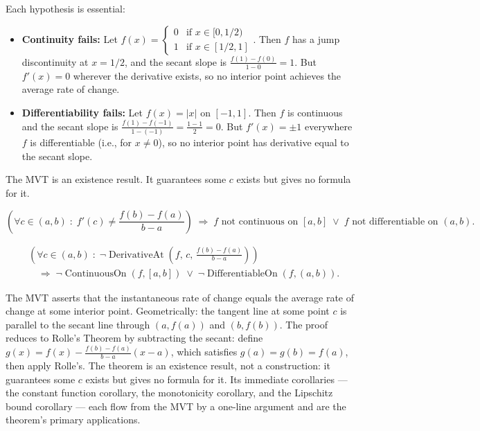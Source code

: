 \begin{remark*}
Each hypothesis is essential:
\begin{itemize}
  \item \textbf{Continuity fails:} Let $f(x) = \begin{cases} 0 & \text{if } x \in [0,1/2) \\ 1 & \text{if } x \in [1/2,1] \end{cases}$. Then $f$ has a jump discontinuity at $x = 1/2$, and the secant slope is $\tfrac{f(1)-f(0)}{1-0} = 1$. But $f'(x) = 0$ wherever the derivative exists, so no interior point achieves the average rate of change.
  \item \textbf{Differentiability fails:} Let $f(x) = |x|$ on $[-1,1]$. Then $f$ is continuous and the secant slope is $\tfrac{f(1)-f(-1)}{1-(-1)} = \tfrac{1-1}{2} = 0$. But $f'(x) = \pm 1$ everywhere $f$ is differentiable (i.e., for $x \ne 0$), so no interior point has derivative equal to the secant slope.
\end{itemize}
The MVT is an existence result. It guarantees some $c$ exists but gives no formula for it.
\end{remark*}

\begin{remark*}
\[
\left(\forall c \in (a,b)\;:\; f'(c) \ne \frac{f(b)-f(a)}{b-a}\right)
\;\Rightarrow\;
f \text{ not continuous on } [a,b]
\;\lor\;
f \text{ not differentiable on } (a,b).
\]
\end{remark*}

\begin{remark*}
\begin{align*}
&\left(\forall c\in(a,b)\;:\;\neg\operatorname{DerivativeAt}\!\left(f,\,c,\,\tfrac{f(b)-f(a)}{b-a}\right)\right)\\
&\quad\Longrightarrow\;
\neg\operatorname{ContinuousOn}(f,[a,b])
\;\lor\;
\neg\operatorname{DifferentiableOn}(f,(a,b)).
\end{align*}
\end{remark*}

\begin{remark*}[Interpretation]
The MVT asserts that the instantaneous rate of change equals the average rate of change at some interior point. Geometrically: the tangent line at some point $c$ is parallel to the secant line through $(a,f(a))$ and $(b,f(b))$. The proof reduces to Rolle's Theorem by subtracting the secant: define $g(x) = f(x) - \tfrac{f(b)-f(a)}{b-a}(x-a)$, which satisfies $g(a)=g(b)=f(a)$, then apply Rolle's. The theorem is an existence result, not a construction: it guarantees some $c$ exists but gives no formula for it. Its immediate corollaries --- the constant function corollary, the monotonicity corollary, and the Lipschitz bound corollary --- each flow from the MVT by a one-line argument and are the theorem's primary applications.
\end{remark*}

